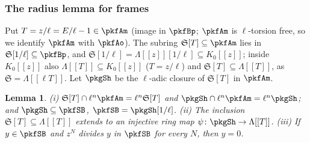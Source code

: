 \documentclass[10pt]{amsart}
\newtheorem{lemma}[theorem]{Lemma}
\theoremstyle{definition}
\theoremstyle{remark}
\begin{document}
\subsubsection{The radius lemma for frames}\label{pkg:ss-radius}

Put $T=z/\ell=E/\ell-1\in\pkfAm$ (image in $\pkfBp$; $\pkfAm$ is $\ell$-torsion free, so we identify
$\pkfAm$ with $\pkfAo$). The subring $\mathfrak S[T]\subseteq\pkfAm$ lies in $\mathfrak S[1/\ell]\subseteq
\pkfBp$, and $\mathfrak S[1/\ell]=\Lambda[[z]][1/\ell]\subseteq K_0[[z]]$; inside $K_0[[z]]$ also
$\Lambda[[T]]\subseteq K_0[[z]]$ ($T=z/\ell$) and $\mathfrak S[T]\subseteq\Lambda[[T]]$, as
$\mathfrak S=\Lambda[[\ell T]]$. Let $\pkgSh$ be the $\ell$-adic closure of $\mathfrak S[T]$ in $\pkfAm$.

\begin{lemma}\label{pkg:Shat}
(i) $\mathfrak S[T]\cap\ell^n\pkfAm=\ell^n\mathfrak S[T]$ and $\pkgSh\cap\ell^n\pkfAm=\ell^n\pkgSh$; and
$\pkgSh\subseteq\pkfSB$, $\pkfSB=\pkgSh[1/\ell]$.
(ii) The inclusion $\mathfrak S[T]\subseteq\Lambda[[T]]$ extends to an injective ring map
$\psi\colon\pkgSh\to\Lambda[[T]]$.
(iii) If $y\in\pkfSB$ and $z^N$ divides $y$ in $\pkfSB$ for every $N$, then $y=0$.
\end{lemma}
\end{document}
